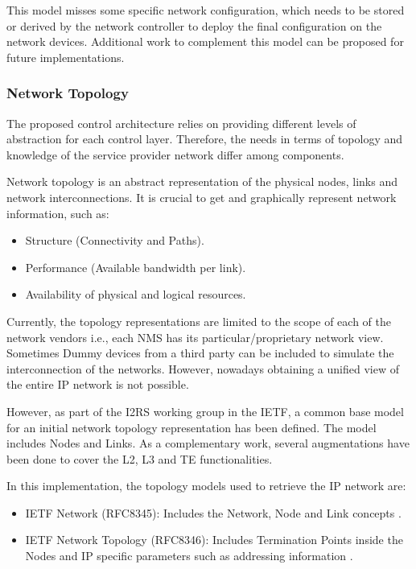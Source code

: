 \documentclass[a4paper,fleqn]{cas-dc}
\begin{document}
This model misses some specific network configuration, which needs to be stored or derived by the network controller to deploy the final configuration on the network devices. Additional work to complement this model can be proposed for future implementations.  

\subsubsection{Network Topology}
\label{subsection:IPtopo}

The proposed control architecture relies on providing different levels of abstraction for each control layer. Therefore, the needs in terms of topology and knowledge of the service provider network differ among components. 

Network topology is an abstract representation of the physical nodes, links and network interconnections. It is crucial to get and graphically represent network information, such as:
\begin{itemize}
    \item Structure (Connectivity and Paths).
    \item Performance (Available bandwidth per link).
    \item Availability of physical and logical resources.
\end{itemize}

Currently, the topology representations are limited to the scope of each of the network vendors i.e., each NMS has its particular/proprietary network view. Sometimes Dummy devices from a third party can be included to simulate the interconnection of the networks. However, nowadays obtaining a unified view of the entire IP network is not possible.

However, as part of the I2RS working group in the IETF, a common base model for an initial network topology representation has been defined. The model includes Nodes and Links. As a complementary work, several augmentations have been done to cover the L2, L3 and TE functionalities.

In this implementation, the topology models used to retrieve the IP network are: 
\begin{itemize}
\item IETF Network (RFC8345): Includes the Network, Node and Link concepts \cite{clemm2018yang}.
\item IETF Network Topology (RFC8346): Includes Termination Points inside the Nodes and IP specific parameters such as addressing information \cite{varga2018internet}.
\end{itemize}
\end{document}
